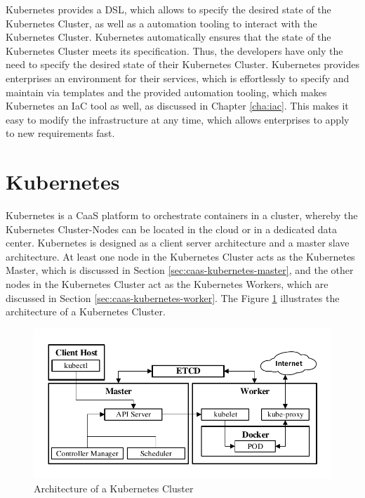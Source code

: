 Kubernetes provides a DSL, which allows to specify the desired state of the Kubernetes Cluster, as well as a automation tooling to interact with the Kubernetes Cluster. Kubernetes automatically ensures that the state of the Kubernetes Cluster meets its specification. Thus, the developers have only the need to specify the desired state of their Kubernetes Cluster. Kubernetes provides enterprises an environment for their services, which is effortlessly to specify and maintain via templates and the provided automation tooling, which makes Kubernetes an IaC tool as well, as discussed in Chapter \vref{cha:iac}. This makes it easy to modify the infrastructure at any time, which allows enterprises to apply to new requirements fast.

\section{Kubernetes}
\label{sec:caas-kubernetes}
Kubernetes is a CaaS platform to orchestrate containers in a cluster, whereby the Kubernetes Cluster-Nodes can be located in the cloud or in a dedicated data center. Kubernetes is designed as a client server architecture and a master slave architecture. At least one node in the Kubernetes Cluster acts as the Kubernetes Master, which is discussed in Section \vref{sec:caas-kubernetes-master}, and the other nodes in the Kubernetes Cluster act as the Kubernetes Workers, which are discussed in Section \vref{sec:caas-kubernetes-worker}. The Figure \ref{fig:kubernetes-cluster-architecture} illustrates the architecture of a Kubernetes Cluster.

\begin{figure}[htbp]
	\centering
	\includegraphics[scale=1]{images/kubernetes-cluster-architecture.pdf}
	\caption{Architecture of a Kubernetes Cluster}
	\label{fig:kubernetes-cluster-architecture}
\end{figure} 

